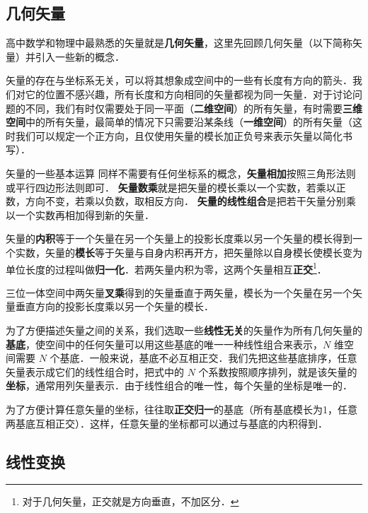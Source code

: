 
\begin{issues}
\issueDraft
\end{issues}

\subsection{几何矢量}
高中数学和物理中最熟悉的矢量就是\textbf{几何矢量}，这里先回顾几何矢量（以下简称矢量）并引入一些新的概念．

矢量的存在与坐标系无关，可以将其想象成空间中的一些有长度有方向的箭头．我们对它的位置不感兴趣，所有长度和方向相同的矢量都视为同一矢量．对于讨论问题的不同，我们有时仅需要处于同一平面（\textbf{二维空间}）的所有矢量，有时需要\textbf{三维空间}中的所有矢量，最简单的情况下只需要沿某条线（\textbf{一维空间}）的所有矢量（这时我们可以规定一个正方向，且仅使用矢量的模长加正负号来表示矢量以简化书写）．

矢量的一些基本运算 同样不需要有任何坐标系的概念，\textbf{矢量相加}按照三角形法则或平行四边形法则即可．
\textbf{矢量数乘}就是把矢量的模长乘以一个实数，若乘以正数，方向不变，若乘以负数，取相反方向． \textbf{矢量的线性组合}是把若干矢量分别乘以一个实数再相加得到新的矢量．

矢量的\textbf{内积}等于一个矢量在另一个矢量上的投影长度乘以另一个矢量的模长得到一个实数，矢量的\textbf{模长}等于矢量与自身内积再开方，把矢量除以自身模长使模长变为单位长度的过程叫做\textbf{归一化}．若两矢量内积为零，这两个矢量相互\textbf{正交}\footnote{对于几何矢量，正交就是方向垂直，不加区分．}．

三位一体空间中两矢量\textbf{叉乘}得到的矢量垂直于两矢量，模长为一个矢量在另一个矢量垂直方向的投影长度乘以另一个矢量的模长．

为了方便描述矢量之间的关系，我们选取一些\textbf{线性无关}的矢量作为所有几何矢量的\textbf{基底}，使空间中的任何矢量可以用这些基底的唯一一种线性组合来表示，$N$ 维空间需要 $N$ 个基底．一般来说，基底不必互相正交．我们先把这些基底排序，任意矢量表示成它们的线性组合时，把式中的 $N$ 个系数按照顺序排列，就是该矢量的\textbf{坐标}，通常用列矢量表示．由于线性组合的唯一性，每个矢量的坐标是唯一的．

为了方便计算任意矢量的坐标，往往取\textbf{正交归一}的基底（所有基底模长为1，任意两基底互相正交）．这样，任意矢量的坐标都可以通过与基底的内积得到．

\subsection{线性变换}

